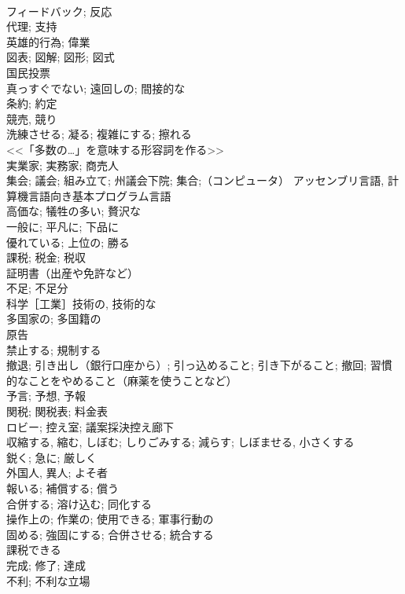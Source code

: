\documentclass[8pt]{extreport}
\begin{document}
\begin{CJK}{UTF8}{min}
\\	フィードバック; 反応	
\\	代理; 支持	
\\	英雄的行為; 偉業	
\\	図表; 図解; 図形; 図式	
\\	国民投票	
\\	真っすぐでない; 遠回しの; 間接的な	
\\	条約; 約定	
\\	競売, 競り	
\\	洗練させる; 凝る; 複雑にする; 擦れる	
\\	<<「多数の…」を意味する形容詞を作る>>	
\\	実業家; 実務家; 商売人	
\\	集会; 議会; 組み立て; 州議会下院; 集合;（コンピュータ） アッセンブリ言語, 計算機言語向き基本プログラム言語	
\\	高価な; 犠牲の多い; 贅沢な	
\\	一般に; 平凡に; 下品に	
\\	優れている; 上位の; 勝る
\\	課税; 税金; 税収	
\\	証明書（出産や免許など）	
\\	不足; 不足分	
\\	科学［工業］技術の, 技術的な	
\\	多国家の; 多国籍の	
\\	原告	
\\	禁止する; 規制する	
\\	撤退; 引き出し（銀行口座から）; 引っ込めること; 引き下がること; 撤回; 習慣的なことをやめること（麻薬を使うことなど）	
\\	予言; 予想, 予報	
\\	関税; 関税表; 料金表	
\\	ロビー; 控え室; 議案採決控え廊下	
\\	収縮する, 縮む, しぼむ; しりごみする; 減らす; しぼませる, 小さくする	
\\	鋭く; 急に; 厳しく	
\\	外国人, 異人; よそ者	
\\	報いる; 補償する; 償う	
\\	合併する; 溶け込む; 同化する	
\\	操作上の; 作業の; 使用できる; 軍事行動の	
\\	固める; 強固にする; 合併させる; 統合する	
\\	課税できる	
\\	完成; 修了; 達成	
\\	不利; 不利な立場	

\end{CJK}
\end{document}
